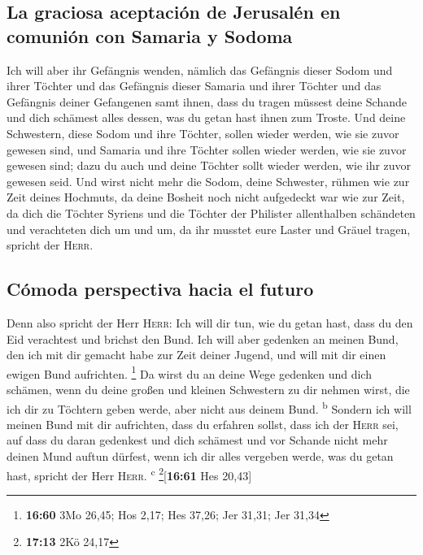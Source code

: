 \hypertarget{la-graciosa-aceptaciuxf3n-de-jerusaluxe9n-en-comuniuxf3n-con-samaria-y-sodoma}{%
\subsection{La graciosa aceptación de Jerusalén en comunión con Samaria
y
Sodoma}\label{la-graciosa-aceptaciuxf3n-de-jerusaluxe9n-en-comuniuxf3n-con-samaria-y-sodoma}}

 Ich will aber ihr Gefängnis wenden, nämlich das
Gefängnis dieser Sodom und ihrer Töchter und das Gefängnis dieser
Samaria und ihrer Töchter und das Gefängnis deiner Gefangenen samt
ihnen,  dass du tragen müssest deine Schande und dich
schämest alles dessen, was du getan hast ihnen zum Troste.
 Und deine Schwestern, diese Sodom und ihre Töchter,
sollen wieder werden, wie sie zuvor gewesen sind, und Samaria und ihre
Töchter sollen wieder werden, wie sie zuvor gewesen sind; dazu du auch
und deine Töchter sollt wieder werden, wie ihr zuvor gewesen seid.
 Und wirst nicht mehr die Sodom, deine Schwester, rühmen
wie zur Zeit deines Hochmuts,  da deine Bosheit noch
nicht aufgedeckt war wie zur Zeit, da dich die Töchter Syriens und die
Töchter der Philister allenthalben schändeten und verachteten dich um
und um,  da ihr musstet eure Laster und Gräuel tragen,
spricht der \textsc{Herr}.

\hypertarget{cuxf3moda-perspectiva-hacia-el-futuro}{%
\subsection{Cómoda perspectiva hacia el
futuro}\label{cuxf3moda-perspectiva-hacia-el-futuro}}

 Denn also spricht der Herr \textsc{Herr}: Ich will dir
tun, wie du getan hast, dass du den Eid verachtest und brichst den Bund.
 Ich will aber gedenken an meinen Bund, den ich mit dir
gemacht habe zur Zeit deiner Jugend, und will mit dir einen ewigen Bund
aufrichten. \footnote{\textbf{16:60} 3Mo 26,45; Hos 2,17; Hes 37,26; Jer
  31,31; Jer 31,34}  Da wirst du an deine Wege gedenken
und dich schämen, wenn du deine großen und kleinen Schwestern zu dir
nehmen wirst, die ich dir zu Töchtern geben werde, aber nicht aus deinem
Bund. \textsuperscript{b}  Sondern ich will meinen Bund
mit dir aufrichten, dass du erfahren sollst, dass ich der \textsc{Herr}
sei,  auf dass du daran gedenkest und dich schämest und
vor Schande nicht mehr deinen Mund auftun dürfest, wenn ich dir alles
vergeben werde, was du getan hast, spricht der Herr \textsc{Herr}.
\textsuperscript{c} \footnote{\textbf{17:13} 2Kö 24,17}{[}\textbf{16:61}
Hes 20,43{]}

